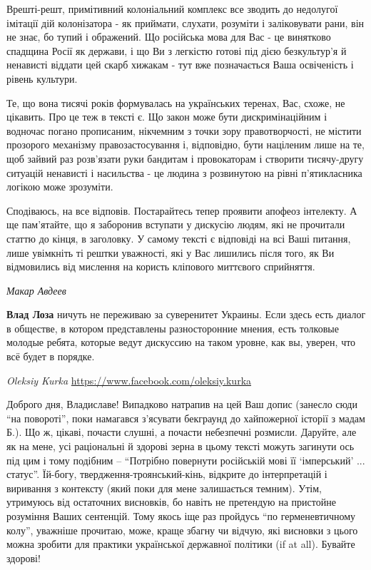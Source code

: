\begin{itemize}
Врешті-решт, примітивний колоніальний комплекс все зводить до недолугої
імітації дій колонізатора - як приймати, слухати, розуміти і заліковувати рани,
він не знає, бо тупий і ображений. Що російська мова для Вас - це винятково
спадщина Росії як держави, і що Ви з легкістю готові під дією безкультур'я й
ненависті віддати цей скарб хижакам - тут вже позначається Ваша освіченість і
рівень культури. 

Те, що вона тисячі років формувалась на українських теренах, Вас, схоже, не
цікавить. Про це теж в тексті є. Що закон може бути дискримінаційним і водночас
погано прописаним, нікчемним з точки зору правотворчості, не містити прозорого
механізму правозастосування і, відповідно, бути націленим лише на те, щоб
зайвий раз розв'язати руки бандитам і провокаторам і створити тисячу-другу
ситуацій ненависті і насильства - це людина з розвинутою на рівні п'ятикласника
логікою може зрозуміти. 

Сподіваюсь, на все відповів. Постарайтесь тепер проявити апофеоз інтелекту. А
ще пам'ятайте, що я заборонив вступати у дискусію людям, які не прочитали
статтю до кінця, в заголовку. У самому тексті є відповіді на всі Ваші питання,
лише увімкніть ті рештки уважності, які у Вас лишились після того, як Ви
відмовились від мислення на користь кліпового миттєвого сприйняття.

\emph{Макар Авдеев}

\textbf{Влад Лоза} ничуть не переживаю за суверенитет Украины. Если здесь есть диалог в
обществе, в котором представлены разносторонние мнения, есть толковые молодые
ребята, которые ведут дискуссию на таком уровне, как вы, уверен, что всё будет
в порядке.

\emph{Oleksiy Kurka}
\url{https://www.facebook.com/oleksiy.kurka}

Доброго дня, Владиславе! Випадково натрапив на цей Ваш допис (занесло сюди
\enquote{на повороті}, поки намагався з'ясувати бекграунд до хайпожерної
історії з мадам Б.). Що ж, цікаві, почасти слушні, а почасти небезпечні
розмисли. Даруйте, але як на мене, усі раціональні й здорові зерна в цьому
тексті можуть загинути ось під цим і тому подібним -- \enquote{Потрібно
повернути російській мові її \enquote{імперський} ... статус}. Їй-богу,
твердження-троянський-кінь, відкрите до інтерпретацій і виривання з контексту
(який поки для мене залишається темним). Утім, утримуюсь від остаточних
висновків, бо навіть не претендую на пристойне розуміння Ваших сентенцій. Тому
якось іще раз пройдусь \enquote{по герменевтичному колу}, уважніше прочитаю,
може, краще збагну чи відчую, які висновки з цього можна зробити для практики
української державної політики (if at all). Бувайте здорові!

\end{itemize}
